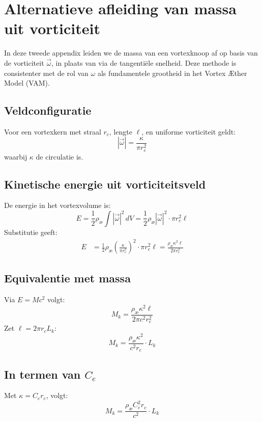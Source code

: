 \section{Alternatieve afleiding van massa uit vorticiteit}

In deze tweede appendix leiden we de massa van een vortexknoop af op basis van de vorticiteit \( \vec{\omega} \), in plaats van via de tangentiële snelheid. Deze methode is consistenter met de rol van \( \omega \) als fundamentele grootheid in het Vortex Æther Model (VAM).

\subsection{Veldconfiguratie}
Voor een vortexkern met straal \( r_c \), lengte \( \ell \), en uniforme vorticiteit geldt:
\begin{equation}
    |\vec{\omega}| = \frac{\kappa}{\pi r_c^2}
\end{equation}
waarbij \( \kappa \) de circulatie is.

\subsection{Kinetische energie uit vorticiteitsveld}
De energie in het vortexvolume is:
\begin{equation}
    E = \frac{1}{2} \rho_\text{\ae} \int |\vec{\omega}|^2 \, dV = \frac{1}{2} \rho_\text{\ae} |\vec{\omega}|^2 \cdot \pi r_c^2 \ell
\end{equation}
Substitutie geeft:
\begin{align}
    E &= \frac{1}{2} \rho_\text{\ae} \left( \frac{\kappa}{\pi r_c^2} \right)^2 \cdot \pi r_c^2 \ell = \frac{\rho_\text{\ae} \kappa^2 \ell}{2 \pi r_c^2}
\end{align}

\subsection{Equivalentie met massa}
Via \( E = M c^2 \) volgt:
\begin{equation}
    M_k = \frac{\rho_\text{\ae} \kappa^2 \ell}{2 \pi c^2 r_c^2}
\end{equation}
Zet \( \ell = 2 \pi r_c L_k \):
\begin{equation}
    M_k = \frac{\rho_\text{\ae} \kappa^2}{c^2 r_c} \cdot L_k
\end{equation}

\subsection{In termen van \( C_e \)}
Met \( \kappa = C_e r_c \), volgt:
\begin{equation}
    M_k = \frac{\rho_\text{\ae} C_e^2 r_c}{c^2} \cdot L_k
\end{equation}


